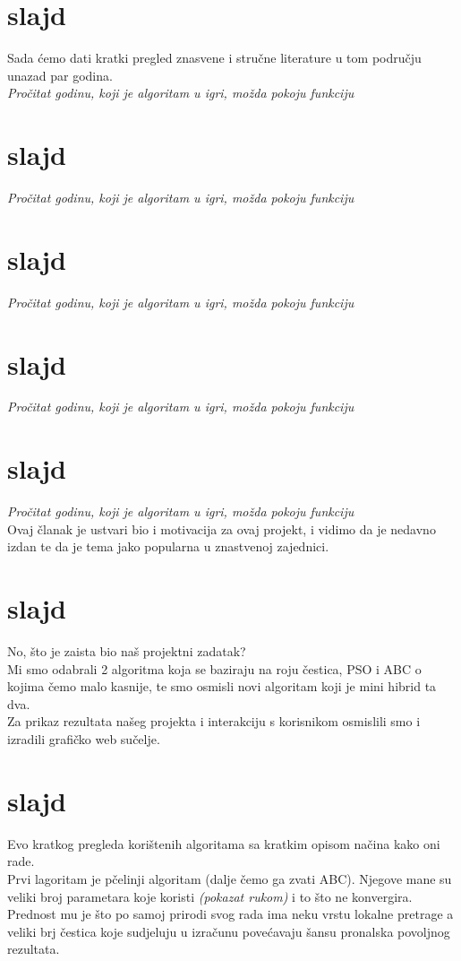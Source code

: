 \documentclass[a4paper,10pt]{article}
\begin{document}
\section{slajd}
Sada \' cemo dati kratki pregled znasvene i stru\v cne literature u tom podru\v cju unazad par godina.\\
\emph{Pro\v citat godinu, koji je algoritam u igri, mo\v zda pokoju funkciju}

\section{slajd}
\emph{Pro\v citat godinu, koji je algoritam u igri, mo\v zda pokoju funkciju}

\section{slajd}
\emph{Pro\v citat godinu, koji je algoritam u igri, mo\v zda pokoju funkciju}
\section{slajd}

\emph{Pro\v citat godinu, koji je algoritam u igri, mo\v zda pokoju funkciju}
\section{slajd}

\emph{Pro\v citat godinu, koji je algoritam u igri, mo\v zda pokoju funkciju}\\
Ovaj \v clanak je ustvari bio i motivacija za ovaj projekt, i vidimo da je nedavno izdan te da je tema jako popularna u znastvenoj zajednici.

\section{slajd}
No, \v sto je zaista bio na\v s projektni zadatak?\\
Mi smo odabrali 2 algoritma koja se baziraju na roju \v cestica, PSO i ABC o kojima \v cemo malo kasnije, te smo osmisli novi algoritam koji je mini hibrid ta dva.\\
Za prikaz rezultata na\v seg projekta i interakciju s korisnikom osmislili smo i izradili grafi\v cko web su\v celje.

\section{slajd}
Evo kratkog pregleda kori\v stenih algoritama sa kratkim opisom na\v cina kako oni rade.\\
Prvi lagoritam je p\v celinji algoritam (dalje \v cemo ga zvati ABC). Njegove mane su veliki broj parametara koje koristi \emph{(pokazat rukom)} i to \v sto ne konvergira. Prednost mu je \v sto po samoj prirodi svog rada ima neku vrstu lokalne pretrage a veliki brj \v cestica koje sudjeluju u izra\v cunu pove\' cavaju \v sansu pronalska povoljnog rezultata.
\end{document}
